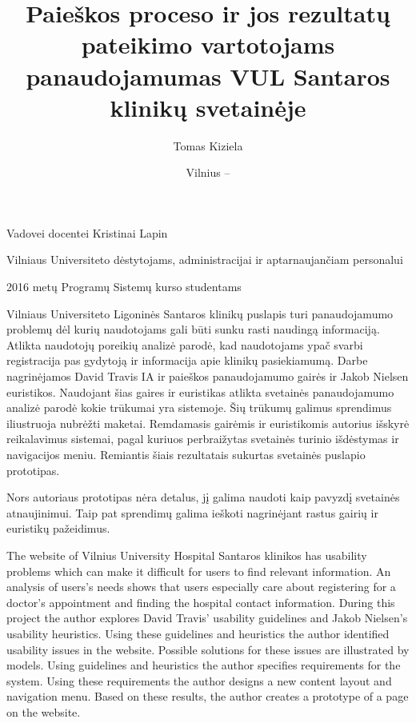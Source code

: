 \documentclass{VUMIFPSbakalaurinis}
\title{Paieškos proceso ir jos rezultatų pateikimo vartotojams panaudojamumas VUL Santaros klinikų svetainėje}
\author{Tomas Kiziela}
\date{Vilnius – \the\year}
\begin{document}
\maketitle
\setcounter{page}{2}

\vspace{7cm}
\begin{center}
    Vadovei docentei Kristinai Lapin
    
    Vilniaus Universiteto dėstytojams, administracijai ir aptarnaujančiam personalui
    
    2016 metų Programų Sistemų kurso studentams
    
\end{center}

Vilniaus Universiteto Ligoninės Santaros klinikų puslapis turi panaudojamumo problemų dėl kurių naudotojams gali būti sunku rasti naudingą informaciją. Atlikta naudotojų poreikių analizė parodė, kad naudotojams ypač svarbi registracija pas gydytoją ir informacija apie klinikų pasiekiamumą. Darbe nagrinėjamos David Travis IA ir paieškos panaudojamumo gairės ir Jakob Nielsen euristikos. Naudojant šias gaires ir euristikas atlikta svetainės panaudojamumo analizė parodė kokie trūkumai yra sistemoje. Šių trūkumų galimus sprendimus iliustruoja nubrėžti maketai. Remdamasis gairėmis ir euristikomis autorius išskyrė reikalavimus sistemai, pagal kuriuos perbraižytas svetainės turinio išdėstymas ir navigacijos meniu. Remiantis šiais rezultatais sukurtas svetainės puslapio prototipas.

Nors autoriaus prototipas nėra detalus, jį galima naudoti kaip pavyzdį svetainės atnaujinimui. Taip pat sprendimų galima ieškoti nagrinėjant rastus gairių ir euristikų pažeidimus.


The website of Vilnius University Hospital Santaros klinikos has usability problems which can make it difficult for users to find relevant information. An analysis of users's needs shows that users especially care about registering for a doctor's appointment and finding the hospital contact information. During this project the author explores David Travis' usability guidelines and Jakob Nielsen's usability heuristics. Using these guidelines and heuristics the author identified usability issues in the website. Possible solutions for these issues are illustrated by models. Using guidelines and heuristics the author specifies requirements for the system. Using these requirements the author designs a new content layout and navigation menu. Based on these results, the author creates a prototype of a page on the website.
\end{document}
